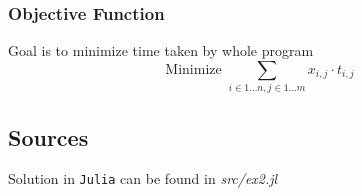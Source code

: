 \subsubsection*{Objective Function}
Goal is to minimize time taken by whole program
$$
\textrm{Minimize } \sum_{i \in 1 \dots n, j \in 1 \dots m}  x_{i,j} \cdot t_{i,j}
$$
\subsection{Sources}
Solution in \texttt{Julia} can be found in \textit{src/ex2.jl}



